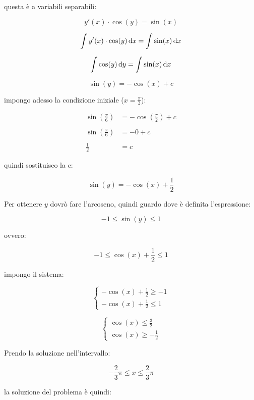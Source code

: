 questa è a variabili separabili:

\[
    y'(x)\cdot\cos(y) = \sin(x)
\]

\[
    \int y'(x)\cdot\cos(y) \mathop{}\!\mathrm{d} x = \int \sin(x) \mathop{}\!\mathrm{d} x
\]

\[
    \int \cos(y) \mathop{}\!\mathrm{d} y = \int \sin(x) \mathop{}\!\mathrm{d} x
\]

\[
    \sin(y) = -\cos(x) +c
\]

impongo adesso la condizione iniziale (\(x=\frac{\pi}{2}\)):

\begin{align*}
    \sin\left(\frac{\pi}{6}\right) & = -\cos\left(\frac{\pi}{2}\right) + c \\ \\
    \sin\left(\frac{\pi}{6}\right) & = -0 +c                               \\ \\
    \frac{1}{2}                    & = c
\end{align*}

quindi sostituisco la c:

\[
    \sin\left(y\right) = - \cos(x) + \frac{1}{2}
\]

Per ottenere \(y\) dovrò fare l'arcoseno, quindi guardo dove è definita l'espressione:

\[
    -1 \le \sin\left(y\right) \le 1
\]

ovvero:

\[
    -1 \le \cos(x) + \frac{1}{2} \le 1
\]

impongo il sistema:

\begin{equation*}
    \begin{cases*}
        -\cos(x) +\frac{1}{2}\ge -1 \\
        -\cos(x) + \frac{1}{2} \le 1
    \end{cases*}
\end{equation*}

\begin{equation*}
    \begin{cases*}
        \cos(x) \le  \frac{3}{2} \\
        \cos(x) \ge -\frac{1}{2}
    \end{cases*}
\end{equation*}

Prendo la soluzione nell'intervallo:

\[
    -\frac{2}{3}\pi \le  x \le  \frac{2}{3}\pi
\]

la soluzione del problema è quindi:

